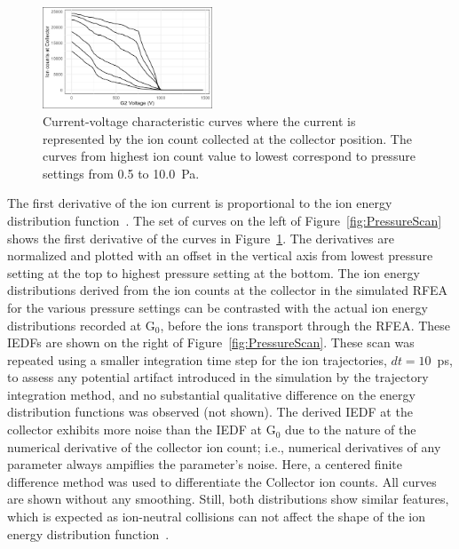 \begin{figure}[htbp]
\centering
\includegraphics[width=0.45\textwidth]{Figures/IVcurve.jpeg}
\caption{Current-voltage characteristic curves where the current is represented by the ion count collected at the collector position. The curves from highest ion count value to lowest correspond to pressure settings from 0.5 to 10.0~Pa.}
\label{fig:IVcurve}
\end{figure}

The first derivative of the ion current is proportional to the ion energy distribution function~\cite{Hutchinson1987}. The set of curves on the left of Figure~\ref{fig:PressureScan} shows the first derivative of the curves in Figure~\ref{fig:IVcurve}. The derivatives are normalized and plotted with an offset in the vertical axis from lowest pressure setting at the top to highest pressure setting at the bottom. The ion energy distributions derived from the ion counts at the collector in the simulated RFEA for the various pressure settings can be contrasted with the actual ion energy distributions recorded at G$_0$, before the ions transport through the RFEA. These IEDFs are shown on the right of Figure~\ref{fig:PressureScan}. These scan was repeated using a smaller integration time step for the ion trajectories, $dt=10$~ps, to assess any potential artifact introduced in the simulation by the trajectory integration method, and no substantial qualitative difference on the energy distribution functions was observed (not shown). The derived IEDF at the collector exhibits more noise than the IEDF at G$_0$ due to the nature of the numerical derivative of the collector ion count; i.e., numerical derivatives of any parameter always ampiflies the parameter's noise. Here, a centered finite difference method was used to differentiate the Collector ion counts. All curves are shown without any smoothing. Still, both distributions show similar features, which is expected as ion-neutral collisions can not affect the shape of the ion energy distribution function~\cite{Baloniak2010}.   

